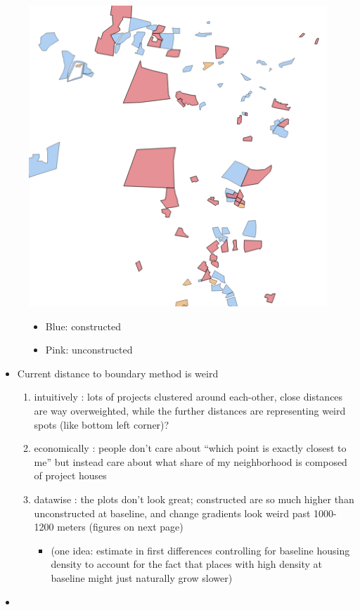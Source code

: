 \documentclass[12pt]{article}
\begin{document}
\begin{figure}
\centering
\includegraphics[scale=.4]{screenshot.png}
\begin{itemize}
\item Blue: constructed
\item Pink: unconstructed
\end{itemize}
\end{figure}

\begin{itemize}
	\item Current distance to boundary method is weird
		\begin{enumerate}
			\item intuitively : lots of projects clustered around each-other, close distances are way overweighted, while the further distances are representing weird spots (like bottom left corner)?
			\item economically : people don't care about ``which point is exactly closest to me'' but instead care about what share of my neighborhood is composed of project houses
			\item datawise : the plots don't look great; constructed are so much higher than unconstructed at baseline, and change gradients look weird past 1000-1200 meters (figures on next page)
				\begin{itemize}
					\item (one idea: estimate in first differences controlling for baseline housing density to account for the fact that places with high density at baseline might just naturally grow slower)
				\end{itemize}
		\end{enumerate} 
	\item 

\end{itemize}
\end{document}
